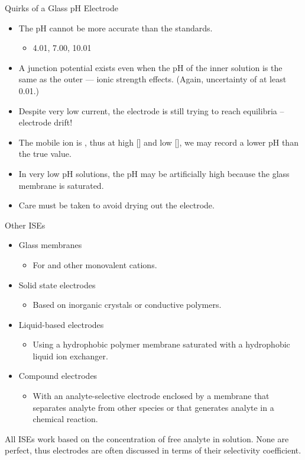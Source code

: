 \documentclass[notes=only]{beamer}
\begin{document}
\begin{frame}{Quirks of a Glass pH Electrode}
	\begin{itemize}
		\item The pH cannot be more accurate than the standards.
			\begin{itemize}
				\item 4.01, 7.00, 10.01
			\end{itemize}
		\item A junction potential exists even when the pH of the inner
			solution is the same as the outer --- ionic strength
			effects. (Again, uncertainty of at least \num{0.01}.)
		\item Despite very low current, the electrode is still trying to
			reach equilibria -- electrode drift!
		\item The mobile ion is , thus at high [] and
			low [], we may record a lower pH than the true
			value.
		\item In very low pH solutions, the pH may be artificially high
			because the glass membrane is \alert{saturated}.
		\item Care must be taken to avoid drying out the electrode.
	\end{itemize}
\end{frame}

\begin{frame}{Other ISEs}
	\begin{itemize}
		\item Glass membranes
			\begin{itemize}
				\item For  and other monovalent cations.
			\end{itemize}
		\item Solid state electrodes
			\begin{itemize}
				\item Based on inorganic crystals or conductive
					polymers.
			\end{itemize}
		\item Liquid-based electrodes
			\begin{itemize}
				\item Using a hydrophobic polymer membrane
					saturated with a hydrophobic liquid ion
					exchanger.
			\end{itemize}
		\item Compound electrodes
			\begin{itemize}
				\item With an analyte-selective electrode
					enclosed by a membrane that separates
					analyte from other species or that
					generates analyte in a chemical
					reaction.
			\end{itemize}
	\end{itemize}

	All ISEs work based on the concentration of \alert{free} analyte in
	solution. None are perfect, thus electrodes are often discussed in terms
	of their \alert{selectivity coefficient}.

	\end{frame}
\end{document}
